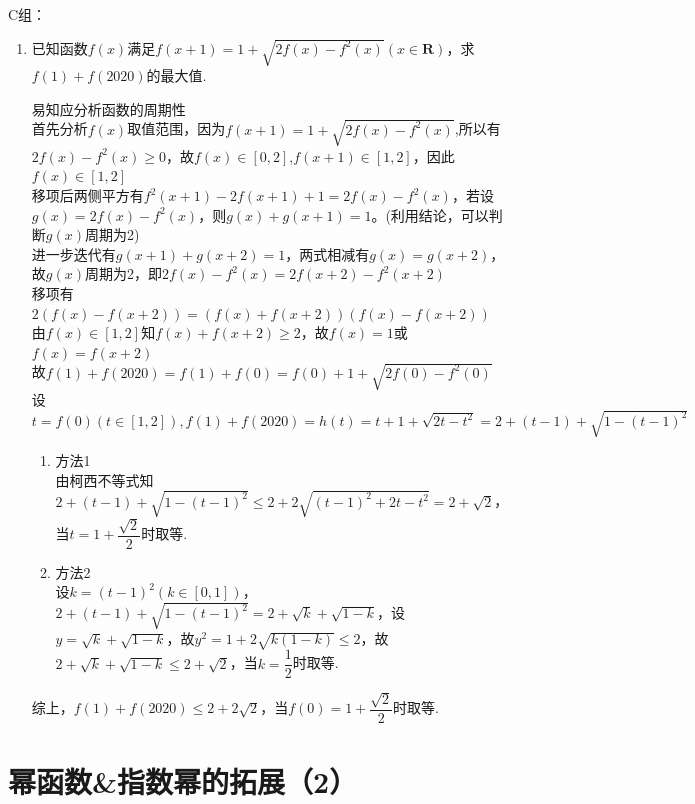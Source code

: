 C组：
\begin{enumerate}
    \item 已知函数$f(x)$满足$f(x+1) = 1+\sqrt{2f(x)-f^2(x)}(x \in \mathbf{R})$，求$f(1) + f(2020)$的最大值.
    \begin{jieda}
        易知应分析函数的周期性 \\
        首先分析$f(x)$取值范围，因为$f(x+1) = 1+\sqrt{2f(x)-f^2(x)}$,所以有$2f(x)-f^2(x) \geq 0$，故$f(x) \in [0, 2]$,$f(x+1) \in [1, 2]$，因此$f(x) \in [1, 2]$ \\
        移项后两侧平方有$f^2(x+1) - 2f(x+1) + 1 = 2f(x) - f^2(x)$，若设$g(x) = 2f(x) - f^2(x)$，则$g(x) + g(x+1) = 1$。(利用结论，可以判断$g(x)$周期为2) \\
        进一步迭代有$g(x+1) + g(x+2) = 1$，两式相减有$g(x)= g(x+2)$，故$g(x)$周期为2，即$2f(x)-f^2(x) = 2f(x+2)  - f^2(x+2)$ \\
        移项有$2(f(x)-f(x+2))= (f(x) + f(x+2))(f(x)- f(x+2))$ \\
        由$f(x) \in [1, 2]$知$f(x) + f(x+2) \geq 2$，故$f(x) = 1$或$f(x) = f(x+2)$ \\
        故$f(1) + f(2020) = f(1) + f(0) = f(0) + 1 + \sqrt{2f(0)-f^2(0)}$ \\
        设$t = f(0) (t \in [1, 2]), f(1) + f(2020) = h(t) = t + 1 + \sqrt{2t-t^2} = 2 + (t-1) + \sqrt{1-(t-1)^2}$ 
        \begin{enumerate}
            \item 方法1 \\
            由柯西不等式知$2 + (t-1) + \sqrt{1-(t-1)^2}\leq 2 + 2\sqrt{(t-1)^2 + 2t-t^2} = 2+\sqrt{2}$，当$t = 1+\dfrac{\sqrt{2}}{2}$时取等.
            \item 方法2 \\
            设$k = (t-1)^2 (k \in [0, 1])$，$2 + (t-1) + \sqrt{1-(t-1)^2} = 2 + \sqrt{k} + \sqrt{1-k}$，设$y = \sqrt{k} + \sqrt{1-k}$，故$y^2 = 1 + 2\sqrt{k(1-k)} \leq 2$，故$2 + \sqrt{k} + \sqrt{1-k} \leq 2 + \sqrt{2}$，当$k = \dfrac{1}{2}$时取等.
        \end{enumerate}
        综上，$f(1) + f(2020) \leq 2+2\sqrt{2}$，当$f(0) = 1+\dfrac{\sqrt{2}}{2}$时取等.
         
    \end{jieda}
    \begin{vspace_}
    \vsp[3]
    \end{vspace_}
\end{enumerate}



\section*{幂函数\&指数幂的拓展（2）}


